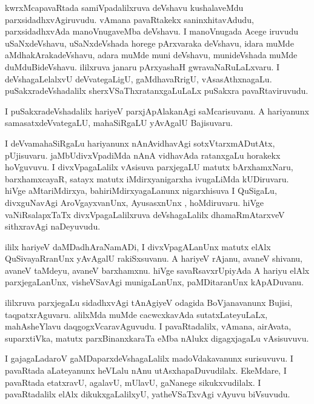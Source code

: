 \documentclass{article}
\begin{document}
\begin{mn}
kwrxMcapavaRtada samiVpadalilxruva deVshavu kushalaveMdu parxsidadhxvAgiruvudu. vAmana 
pavaRtakekx saninxhitavAdudu, parxsidadhxvAda manoVnugaveMba deVshavu. I manoVnugada Acege 
iruvudu uSaNxdeVshavu, uSaNxdeVshada horege pArxvaraka deVshavu, idara muMde aMdhakArakadeVshavu,
adara muMde muni deVshavu, munideVshada muMde duMduBideVshavu. ililxruva janaru pArxyashaH 
gwravaNaRuLaLxvaru. I deVshagaLelalxvU deVvategaLigU, gaMdhavaRrigU, vAsasAthxnagaLu.
puSakxradeVshadalilx sherxVSaThxratanxgaLuLaLx puSakxra pavaRtaviruvudu.
\end{mn}

\begin{mn}
I puSakxradeVshadalilx hariyeV parxjApAlakanAgi saMcarisuvanu. A hariyanunx samasatxdeVvategaLU,
mahaSiRgaLU yAvAgalU Bajisuvaru.
\end{mn}

\begin{mn}
I deVvamahaSiRgaLu hariyanunx nAnAvidhavAgi sotxVtarxmADutAtx, pUjisuvaru. jaMbUdivxVpadiMda nAnA
vidhavAda ratanxgaLu horakekx hoVguvuvu. I divxVpagaLalilx vAsisuva parxjegaLU matutx bArxhamxNaru,
barxhamxcayaR, satayx matutx iMdirxyanigarxha ivugaLiMda kUDiruvaru. hiVge aMtariMdirxya, 
bahiriMdirxyagaLanunx nigarxhisuva I QuSigaLu, divxguNavAgi AroVgayxvanUnx, AyusasxnUnx , 
hoMdiruvaru. hiVge vaNiRsalapxTaTx divxVpagaLalilxruva  deVshagaLalilx dhamaRmAtarxveV 
sithxravAgi naDeyuvudu.
\end{mn}

\begin{mn}
ililx hariyeV daMDadhAraNamADi, I divxVpagALanUnx matutx elAlx QuSivayaRranUnx yAvAgalU 
rakiSxsuvanu. A  hariyeV rAjanu, avaneV shivanu, avaneV taMdeyu, avaneV barxhamxnu. 
hiVge savaRsavxrUpiyAda A hariyu elAlx parxjegaLanUnx, visheVSavAgi munigaLanUnx, 
paMDitaranUnx kApADuvanu.
\end{mn}


\begin{mn}
ililxruva parxjegaLu sidadhxvAgi tAnAgiyeV odagida BoVjanavanunx Bujisi, taqpatxrAguvaru. 
alilxMda muMde cacwcxkavAda sutatxLateyuLaLx, mahAsheYlavu daqgogxVcaravAguvudu.
I pavaRtadalilx, vAmana, airAvata, suparxtiVka, matutx parxBinanxkaraTa eMba nAlukx digagxjagaLu
vAsisuvuvu.
\end{mn}

\begin{mn}
I gajagaLadaroV gaMDaparxdeVshagaLalilx madoVdakavanunx surisuvuvu. I pavaRtada aLateyanunx 
heVLalu nAnu utAsxhapaDuvudilalx. EkeMdare, I pavaRtada etatxravU, agalavU, mUlavU, gaNanege 
sikukxvudilalx. I pavaRtadalilx elAlx dikukxgaLalilxyU, yatheVSaTxvAgi vAyuvu biVsuvudu.
\end{mn}
\end{document}
